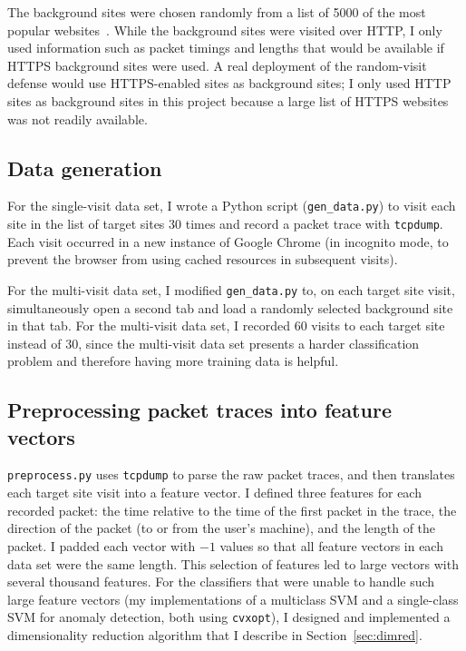 \documentclass[10pt, twocolumn]{article}
\begin{document}
The background sites were chosen randomly from a list of 5000 of the most popular websites~\cite{alexa}. 
While the background sites were visited over HTTP, I only used information such as packet timings and 
lengths that would be available if HTTPS background sites were used. A real deployment of the 
random-visit defense would use HTTPS-enabled sites as background sites; I only used HTTP sites as 
background sites in this project because a large list of HTTPS websites was not readily available.

\subsection{Data generation}

For the single-visit data set, I wrote a Python script (\texttt{gen\_data.py}) to visit each site 
in the list of target sites 30 times and record a packet trace with \texttt{tcpdump}. Each visit 
occurred in a new instance of Google Chrome (in incognito mode, to prevent the browser from 
using cached resources in subsequent visits).

For the multi-visit data set, I modified \texttt{gen\_data.py} to, on each target site visit, 
simultaneously open a second tab and load a randomly selected background site in that tab. For the 
multi-visit data set, I recorded 60 visits to each target site instead of 30, since the multi-visit 
data set presents a harder classification problem and therefore having more training data is helpful.

\subsection{Preprocessing packet traces into feature vectors}
\label{sec:preprocessing}

\texttt{preprocess.py} uses \texttt{tcpdump} to parse the raw packet traces, and then translates 
each target site visit into a feature vector. I defined three features for each recorded packet: the 
time relative to the time of the first packet in the trace, the direction of the packet (to or from 
the user's machine), and the length of the packet. I padded each vector with $-1$ values so that all 
feature vectors in each data set were the same length. This selection of features led to large vectors 
with several thousand features. For the classifiers that were unable to handle such large feature vectors 
(my implementations of a multiclass SVM and a single-class SVM for anomaly detection, both using 
\texttt{cvxopt}), I designed and implemented a dimensionality reduction algorithm that I describe in 
Section~\ref{sec:dimred}.
\end{document}
